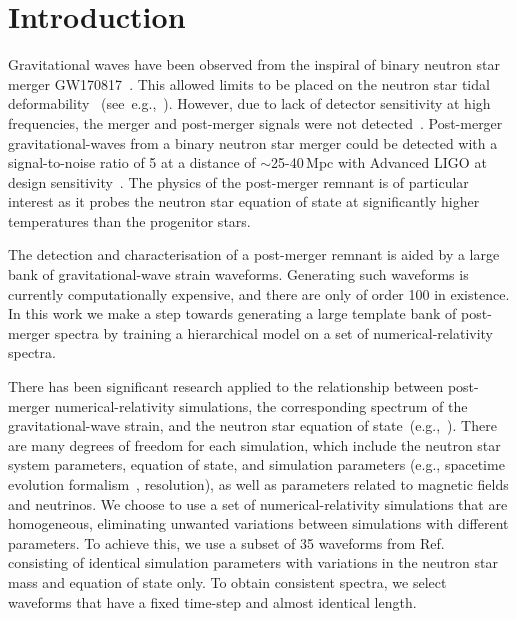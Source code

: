 \documentclass[../Thesis.tex]{subfiles}
\begin{document}
\section{Introduction}
    Gravitational waves have been  observed from the inspiral of binary neutron star merger GW170817~\cite{GW170817Detection}. This allowed limits to be placed on the neutron star tidal deformability ~(see~e.g.,~\cite{GW170817Detection,Annala2018,Radice2018,Most2018,De2018,GW170817Properties}). However, due to lack of detector sensitivity at high frequencies, the merger and post-merger signals were not detected~\cite{GW170817Properties,GW170817Postmerger1,GW170817Postmerger2}. Post-merger gravitational-waves from a binary neutron star merger could be detected with a signal-to-noise ratio of 5 at a distance of $\sim$25-40\,Mpc with Advanced LIGO at design sensitivity~\cite{Takami2014}.  The physics of the post-merger remnant is of particular interest as it probes the neutron star equation of state at significantly higher temperatures than the progenitor stars.\par 
    The detection and characterisation of a post-merger remnant is aided by a large bank of gravitational-wave strain waveforms. Generating such waveforms is currently computationally expensive, and there are only of order 100 in existence. In this work we make a step towards generating a large template bank of post-merger spectra by training a hierarchical model on a set of numerical-relativity spectra.\par    
    There has been significant research applied to the relationship between post-merger numerical-relativity simulations, the corresponding spectrum of the gravitational-wave strain, and the neutron star equation of state~(e.g.,~\cite{Stergioulas2011,Bauswein2012,Read2013,Hotokezaka2013,Takami2014,Bernuzzi2015,Takami2015,Clark2016postmerger,Rezzolla2016,Radice2017,Dietrich2017b,Radice2017a,Pietri2018,Dietrich2018,Dietrich2018a,Bose2018}). There are many degrees of freedom for each simulation, which include the neutron star system parameters, equation of state, and  simulation parameters (e.g., spacetime evolution formalism~\cite{Baiotti2017}, resolution), as well as parameters related to magnetic fields and neutrinos. We choose to use a set of numerical-relativity simulations that are homogeneous, eliminating unwanted variations between simulations with different parameters. To achieve this, we use a subset of 35 waveforms from Ref.~\cite{Rezzolla2016} consisting of identical simulation parameters with variations in the neutron star mass and equation of state only. To obtain consistent spectra, we select waveforms that have a fixed time-step and almost identical length. \par
\end{document}
